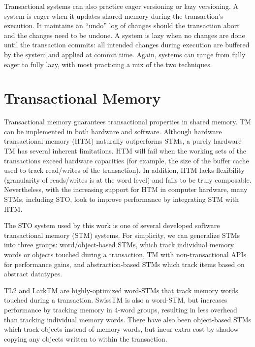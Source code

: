 Transactional systems can also practice eager versioning or lazy versioning. A system is eager when it updates shared memory during the transaction's execution. It maintains an ``undo'' log of changes should the transaction abort and the changes need to be undone. A system is lazy when no changes are done until the transaction commits: all intended changes during execution are buffered by the system and applied at commit time. Again, systems can range from fully eager to fully lazy, with most practicing a mix of the two techniques.

\section{Transactional Memory}
Transactional memory\cite{harristm}\cite{herlihytm} guarantees transactional properties in shared memory. TM can be implemented in both hardware and software. Although hardware transactional memory (HTM) naturally outperforms STMs, a purely hardware TM has several inherent limitations. HTM will fail when the working sets of the transactions exceed hardware capacities (for example, the size of the buffer cache used to track read/writes of the transaction). In addition, HTM lacks flexibility (granularity of reads/writes is at the word level) and fails to be truly composable\cite{htm}. Nevertheless, with the increasing support for HTM in computer hardware, many STMs, including STO, look to improve performance by integrating STM with HTM.

The STO system\cite{sto} used by this work is one of several developed software transactional memory (STM) systems. For simplicity, we can generalize STMs into three groups: word/object-based STMs, which track individual memory words or objects touched during a transaction, TM with non-transactional APIs for performance gains, and abstraction-based STMs which track items based on abstract datatypes.

TL2\cite{tl2} and LarkTM\cite{larktm} are highly-optimized word-STMs that track memory words touched during a transaction. SwissTM\cite{swisstm} is also a word-STM, but increases performance by tracking memory in 4-word groups, resulting in less overhead than tracking individual memory words. There have also been object-based STMs which track objects instead of memory words, but incur extra cost by shadow copying any objects written to within the transaction. 

